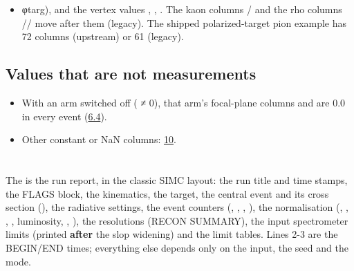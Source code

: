 \begin{itemize}
\item φtarg), and the vertex values , , . The kaon columns / and the rho columns
// move after them (legacy). The shipped polarized-target pion example has 72 columns (upstream)
or 61 (legacy).
\end{itemize}
\subsection{\texorpdfstring{Values that are not measurements}{Values that are not measurements}}\label{user_manual-07u5foutputs:719-values-that-are-not-measurements}
\begin{itemize}
\item With an arm switched off (\hyperref[param:spectu5fmode]{} ≠ 0), that arm's focal-plane columns and  are 0.0 in every event
(\hyperref[user_manual-06u5fspectrometers:64-spectu5fmode-switching-the-spectrometer-monte-carlo-off]{6.4}).
\item Other constant or NaN columns: \hyperref[user_manual-10u5ffaq:nan-or-constant-columns-in-the-tree]{10}.
\end{itemize}
\section{\texorpdfstring{}{.hist}}\label{user_manual-07u5foutputs:72-hist}
The  is the run report, in the classic SIMC layout: the run title and
time stamps, the FLAGS block, the kinematics, the target, the central event and its cross section (), the
radiative settings, the event counters (, , , ), the
normalisation (, , , , luminosity, , ), the resolutions
(RECON SUMMARY), the input spectrometer limits (printed \textbf{after} the slop widening) and the limit
tables. Lines 2-3 are the BEGIN/END times; everything else depends only on the input, the seed and the mode.

